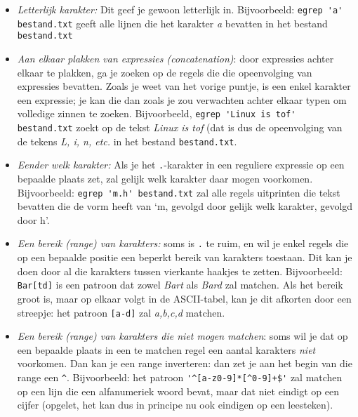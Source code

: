 \documentclass[a4paper,twoside,openany]{memoir}
\begin{document}
\begin{itemize}

  \item \emph{Letterlijk karakter:} Dit geef je gewoon letterlijk in.
    Bijvoorbeeld: \verb!egrep 'a' bestand.txt! geeft alle lijnen die het
    karakter \emph{a} bevatten in het bestand \verb!bestand.txt!

  \item \emph{Aan elkaar plakken van expressies (concatenation)}: door
    expressies achter elkaar te plakken, ga je zoeken op de regels die die
    opeenvolging van expressies bevatten. Zoals je weet van het vorige puntje,
    is een enkel karakter een expressie; je kan die dan zoals je zou verwachten
    achter elkaar typen om volledige zinnen te zoeken. Bijvoorbeeld,
    \verb!egrep 'Linux is tof' bestand.txt! zoekt op de tekst \emph{Linux is
    tof} (dat is dus de opeenvolging van de tekens \emph{L, i, n, etc.} in het
    bestand \verb!bestand.txt!.

  \item \emph{Eender welk karakter:} Als je het \verb!.!-karakter in een
    reguliere expressie op een bepaalde plaats zet, zal gelijk welk karakter
    daar mogen voorkomen. Bijvoorbeeld: \verb!egrep 'm.h' bestand.txt! zal alle
    regels uitprinten die tekst bevatten die de vorm heeft van `m, gevolgd door
    gelijk welk karakter, gevolgd door h'.

  \item \emph{Een bereik (range) van karakters:} soms is \verb!.! te ruim, en
    wil je enkel regels die op een bepaalde positie een beperkt bereik van
    karakters toestaan. Dit kan je doen door al die karakters tussen vierkante
    haakjes te zetten. Bijvoorbeeld: \verb!Bar[td]! is een patroon dat zowel
    \emph{Bart} als \emph{Bard} zal matchen. Als het bereik groot is, maar op
    elkaar volgt in de ASCII-tabel, kan je dit afkorten door een streepje: het
    patroon \verb![a-d]! zal \emph{a,b,c,d} matchen.
  
  \item \emph{Een bereik (range) van karakters die \emph{niet} mogen matchen}:
    soms wil je dat op een bepaalde plaats in een te matchen regel een aantal
    karakters \emph{niet} voorkomen. Dan kan je een range inverteren: dan zet
    je aan het begin van die range een \verb!^!. Bijvoorbeeld:
    het patroon \verb!'^[a-z0-9]*[^0-9]+$'! zal matchen op een lijn die een
    alfanumeriek woord bevat, maar dat niet eindigt op een cijfer (opgelet,
    het kan dus in principe nu ook eindigen op een leesteken).


\end{itemize}
\end{document}
